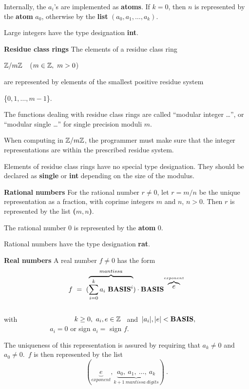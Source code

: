 Internally, the $a_i$'s are implemented as {\bf atoms}.  If $ k=0$,
then $n$ is represented by the {\bf atom} $a_0$, otherwise by the 
{\bf list} $(a_0, a_1, \ldots, a_k)$.

Large integers have the type designation {\bf int}.

\newpage

{\bf Residue class rings}
\leer  
The elements of a residue class ring
\begin{center}
                        $ \mbox{$\mathbb Z$}/m\mbox{$\mathbb Z$}$\ \  ($m \in \mbox{$\mathbb Z$},\ m > 0$)
\end{center}
are represented by elements of the smallest positive residue system
\begin{center}
                         \{$0, 1, \ldots, m-1$\}.
\end{center}
The functions dealing with residue class rings are called ``mo\-du\-lar integer \ldots'',
or ``modular single \ldots'' for single precision moduli $m$.

When computing in $\mbox{$\mathbb Z$}/m\mbox{$\mathbb Z$}$, the programmer must make sure that the integer representations
are within the prescribed residue system.

Elements of residue class rings have no special type designation. They
should be declared as {\bf single} or {\bf int} depending on the size
of the modulus.

\leer
{\bf Rational numbers}
\leer 
For the rational number $r \not= 0$, let $r = m/n$ be the unique representation as a fraction,
with coprime integers $m$ and $n$,  $n>0$. Then {\bf $r$} is represented by the list {\bf ($ m, n$)}.

The rational number $0$ is represented by the {\bf atom} $0$. 

Rational numbers have the type designation {\bf rat}.

\leer
{\bf Real numbers}
\leer
A real number $f \not= 0$ has the form
$$
          f \ = \ (\overbrace{\sum_{i=0}^k a_i\ \mbox{\bf BASIS}{\/}^i}^{mantissa})
          \cdot \mbox{\bf BASIS}^{\overbrace{e}^{exponent}} 
$$\\
with  $ \ \ \ \ \ \ \ \ \ \ \ \ \ \ \ \ \ \ \ \ \ \ \ \  k\geq 0,\ 
a_i,e \in \Z$  \ and\  $  |a_i|,|e| < \mbox{\bf BASIS},$\\ 
$_{~}$ 
$\ \ \ \ \ \ \ \ \ \ \ \ \ \ \ \ \ \ \ \ \ \ \ \ \ \ \ \  a_i = 0 $ 
or sign $a_i = $ sign $f$.

The uniqueness of this representation is assured by requiring that $a_k \not= 0$ and
$a_0 \not= 0$.\ $f$ is then represented by the list 
$$
          (\underbrace{e}_{exponent},\underbrace{a_0,\ a_1,\ \ldots,\  
          a_k}_{k+1\ mantissa\ digits})\ .
$$


